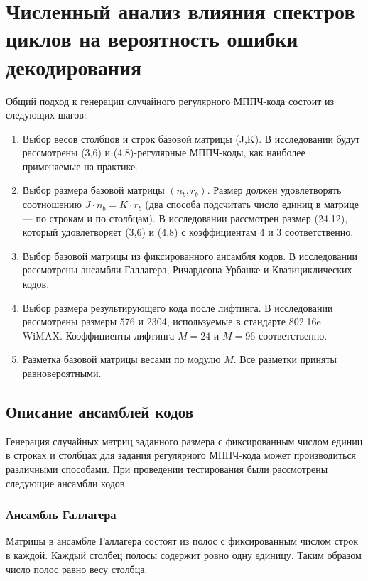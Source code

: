 \chapter{Численный анализ влияния спектров циклов на вероятность ошибки 
декодирования} 

Общий подход к генерации случайного регулярного МППЧ-кода состоит из следующих шагов:
\begin{enumerate}
	\item Выбор весов столбцов и строк базовой матрицы (J,K). В исследовании будут рассмотрены
	(3,6) и (4,8)-регулярные МППЧ-коды, как наиболее применяемые на практике.
	\item Выбор размера базовой матрицы $(n_b,r_b)$. Размер должен удовлетворять соотношению 
	$J \cdot n_b = K \cdot r_b$ (два способа подсчитать число единиц в матрице --- по строкам и по столбцам).
	В исследовании рассмотрен размер (24,12), который удовлетворяет (3,6) и (4,8) с коэффициентам 4 и 3
	соответственно.
	\item Выбор базовой матрицы из фиксированного ансамбля кодов. В исследовании рассмотрены ансамбли
	Галлагера, Ричардсона-Урбанке и Квазициклических кодов.
	\item Выбор размера результирующего кода после лифтинга. В исследовании рассмотрены размеры
	576 и 2304, используемые в стандарте 802.16e WiMAX. Коэффициенты лифтинга $M=24$ и $M=96$
	соответственно.
	\item Разметка базовой матрицы весами по модулю $M$. Все разметки приняты равновероятными.
\end{enumerate}

\section{Описание ансамблей кодов}

Генерация случайных матриц заданного размера с фиксированным числом единиц в строках и столбцах для
задания регулярного МППЧ-кода может производиться различными способами. При проведении
тестирования были рассмотрены следующие ансамбли кодов.

\subsection{Ансамбль Галлагера}

Матрицы в ансамбле Галлагера состоят из полос с фиксированным числом строк в каждой. Каждый столбец
полосы содержит ровно одну единицу. Таким образом число полос равно весу столбца.

